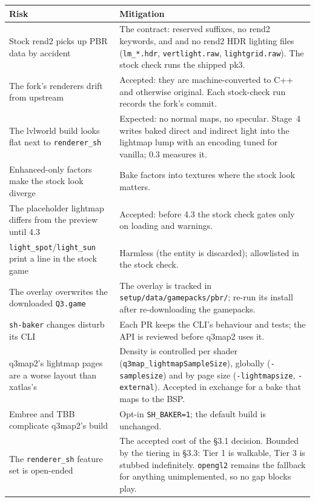 \documentclass[11pt,a4paper]{article}
\begin{document}
\begin{longtable}{@{}p{}p{}@{}}
\toprule
Risk & Mitigation \\
\midrule
\endhead
Stock rend2 picks up PBR data by accident &
  The contract: reserved suffixes, no rend2 keywords, and and no rend2 HDR lighting files (\texttt{lm\_*.hdr}, \texttt{vertlight.raw}, \texttt{lightgrid.raw}). The stock check runs
  the shipped pk3. \\
The fork's renderers drift from upstream &
  Accepted: they are machine-converted to C++ and otherwise original. Each stock-check run records
  the fork's commit. \\
The lvlworld build looks flat next to \texttt{renderer\_sh} &
  Expected: no normal maps, no specular. Stage~4 writes baked direct and indirect light into the
  lightmap lump with an encoding tuned for vanilla; 0.3 measures it. \\
Enhanced-only factors make the stock look diverge &
  Bake factors into textures where the stock look matters. \\
The placeholder lightmap differs from the preview until 4.3 &
  Accepted: before 4.3 the stock check gates only on loading and warnings. \\
\texttt{light\_spot}/\texttt{light\_sun} print a line in the stock game &
  Harmless (the entity is discarded); allowlisted in the stock check. \\
The overlay overwrites the downloaded \texttt{Q3.game} &
  The overlay is tracked in \texttt{setup/data/gamepacks/pbr/}; re-run its install after
  re-downloading the gamepacks. \\
\texttt{sh-baker} changes disturb its CLI &
  Each PR keeps the CLI's behaviour and tests; the API is reviewed before q3map2 uses it. \\
q3map2's lightmap pages are a worse layout than xatlas's &
  Density is controlled per shader (\texttt{q3map\_lightmapSampleSize}), globally
  (\texttt{-samplesize}) and by page size (\texttt{-lightmapsize}, \texttt{-external}). Accepted in
  exchange for a bake that maps to the BSP. \\
Embree and TBB complicate q3map2's build &
  Opt-in \texttt{SH\_BAKER=1}; the default build is unchanged. \\
The \texttt{renderer\_sh} feature set is open-ended &
  The accepted cost of the §3.1 decision. Bounded by the tiering in §3.3: Tier 1 is walkable, Tier
  3 is stubbed indefinitely. \texttt{opengl2} remains the fallback for anything unimplemented, so
  no gap blocks play. \\

\end{longtable}
\end{document}
